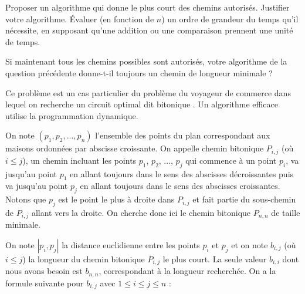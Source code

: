 \vspace{-2cm}

\Q
Proposer un algorithme qui donne le plus court des chemins autorisés. Justifier votre algorithme. Évaluer (en fonction de $n$) un ordre de grandeur du temps qu'il nécessite, en supposant qu'une addition ou une comparaison prennent une unité de temps.

\Q
Si maintenant tous les chemins possibles sont autorisés, votre algorithme de la question précédente donne-t-il toujours un chemin de longueur minimale ?

\Corrige

\Q
Ce problème est un cas particulier du \og problème du voyageur de commerce \fg{} dans lequel on recherche un circuit optimal dit \og bitonique \fg{}. Un algorithme efficace utilise la programmation dynamique.
\medskip

On note $(p_1, p_2, ..., p_n)$ l'ensemble des points du plan correspondant aux maisons ordonnées par abscisse croissante. On appelle \og chemin bitonique \fg{} $P_{i,j}$ (où $i \leq j$), un chemin incluant les points $p_1$, $p_2$, ..., $p_j$ qui commence à un point $p_i$, va jusqu'au point $p_1$ en allant toujours dans le sens des abscisses décroissantes puis va jusqu'au point $p_j$ en allant toujours dans le sens des abscisses croissantes. Notons que $p_j$ est le point le plus à droite dans $P_{i,j}$ et fait partie du sous-chemin de $P_{i,j}$ allant vers la droite. On cherche donc ici le chemin bitonique $P_{n,n}$ de taille minimale.
\medskip

On note $|p_i, p_j|$ la distance euclidienne entre les points $p_i$ et $p_j$ et on note $b_{i,j}$ (où $i \leq j$) la longueur du chemin bitonique $P_{i,j}$ le plus court. La seule valeur $b_{i,i}$ dont nous avons besoin est $b_{n,n}$, correspondant à la longueur recherchée. On a la formule suivante pour $b_{i,j}$ avec $1 \leq i \leq j \leq n$ :
\smallskip

